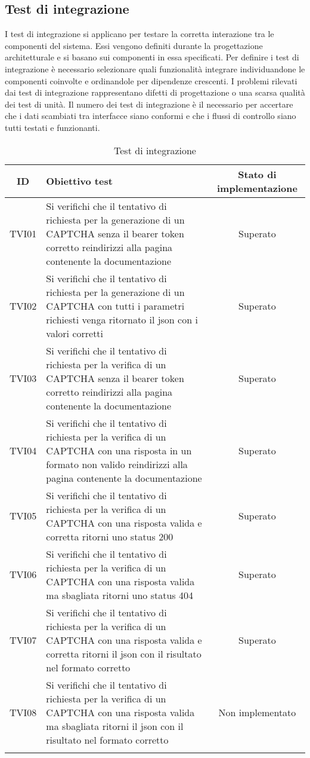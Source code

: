 \subsection{Test di integrazione}
I test di integrazione si applicano per testare la corretta interazione tra le componenti del sistema. Essi vengono definiti durante la progettazione architetturale e si basano sui componenti in essa specificati.
Per definire i test di integrazione è necessario selezionare quali funzionalità integrare individuandone le componenti coinvolte e ordinandole per dipendenze crescenti.
I problemi rilevati dai test di integrazione rappresentano difetti di progettazione o una scarsa qualità dei test di unità. Il numero dei test di integrazione è il necessario per accertare che i dati scambiati tra interfacce siano conformi e che i flussi di controllo siano tutti testati e funzionanti.
\begin{center}
	\setlength\extrarowheight{5pt}
	\begin{xltabular}{\textwidth}{|c|X|c|}
		\hline
		\textbf{ID} & \textbf{Obiettivo test} & \textbf{Stato di implementazione} \\
		\hline
		TVI01 & Si verifichi che il tentativo di richiesta per la generazione di un CAPTCHA senza il bearer token corretto reindirizzi alla pagina contenente la documentazione & Superato\\
		\hline
		TVI02 & Si verifichi che il tentativo di richiesta per la generazione di un CAPTCHA con tutti i parametri richiesti venga ritornato il json con i valori corretti & Superato\\
		\hline
		TVI03 & Si verifichi che il tentativo di richiesta per la verifica di un CAPTCHA senza il bearer token corretto reindirizzi alla pagina contenente la documentazione & Superato\\
		\hline
		TVI04 & Si verifichi che il tentativo di richiesta per la verifica di un CAPTCHA con una risposta in un formato non valido reindirizzi alla pagina contenente la documentazione & Superato\\
		\hline
		TVI05 & Si verifichi che il tentativo di richiesta per la verifica di un CAPTCHA con una risposta valida e corretta ritorni uno status 200 & Superato\\
		\hline
		TVI06 & Si verifichi che il tentativo di richiesta per la verifica di un CAPTCHA con una risposta valida ma sbagliata ritorni uno status 404 & Superato\\
		\hline
		TVI07 & Si verifichi che il tentativo di richiesta per la verifica di un CAPTCHA con una risposta valida e corretta ritorni il json con il risultato nel formato corretto & Superato\\
		\hline
		TVI08 & Si verifichi che il tentativo di richiesta per la verifica di un CAPTCHA con una risposta valida ma sbagliata ritorni il json con il risultato nel formato corretto & Non implementato\\
		\hline
		\caption{Test di integrazione}
	\end{xltabular}
\end{center}

